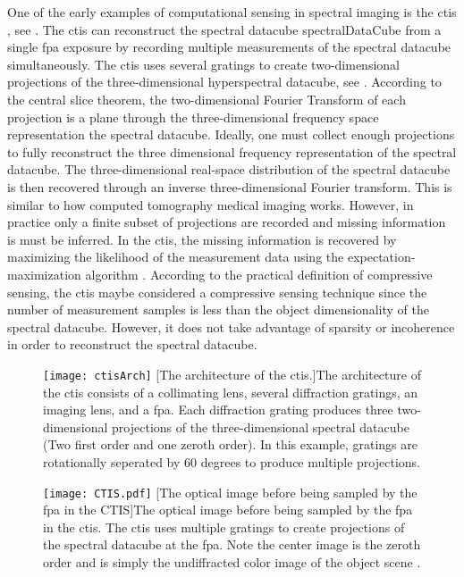 One of the early examples of computational sensing in spectral imaging is the \gls{ctis} \cite{descour1995computed}, see . The \gls{ctis} can reconstruct the spectral datacube \gls{spectralDataCube} from a single \gls{fpa} exposure by recording multiple measurements of the spectral datacube simultaneously. The \gls{ctis} uses several gratings to create two-dimensional projections of the three-dimensional hyperspectral datacube, see . According to the central slice theorem, the two-dimensional Fourier Transform of each projection is a plane through the three-dimensional frequency space representation the spectral datacube. Ideally, one must collect enough projections to fully reconstruct the three dimensional frequency representation of the spectral datacube. The three-dimensional real-space distribution of the spectral datacube is then recovered through an inverse three-dimensional Fourier transform. This is similar to how computed tomography medical imaging works. However, in practice only a finite subset of projections are recorded and missing information is must be inferred. In the \gls{ctis}, the missing information is recovered by maximizing the likelihood of the measurement data using the expectation-maximization algorithm \cite{steven1993fundamentals, moon1996expectation}. According to the practical definition of compressive sensing, the \gls{ctis} maybe considered a compressive sensing technique since the number of measurement samples is less than the object dimensionality of the spectral datacube. However, it does not take advantage of sparsity or incoherence in order to reconstruct the spectral datacube.

\begin{figure}
	\texttt{[image: ctisArch]}
	[The architecture of the \acrfull{ctis}.]{The architecture of the \acrfull{ctis} consists of a collimating lens, several diffraction gratings, an imaging lens, and a \acrfull{fpa}. Each diffraction grating produces three two-dimensional projections of the three-dimensional spectral datacube (Two first order and one zeroth order). In this example,  gratings are rotationally seperated by 60 degrees to produce multiple projections. \cite{descour1995computed}}
	\label{fig:ctisArch}
\end{figure}

\begin{figure}
	\centering
	\texttt{[image: CTIS.pdf]}
	[The optical image before being sampled by the \gls{fpa} in the CTIS]{The optical image before being sampled by the \gls{fpa} in the \gls{ctis}. The \gls{ctis} uses multiple gratings to create projections of the spectral datacube at the \gls{fpa}. Note the center image is the zeroth order and is simply the undiffracted color image of the object scene \cite{descour1995computed}.}
	\label{fig:CTIS}
\end{figure}

